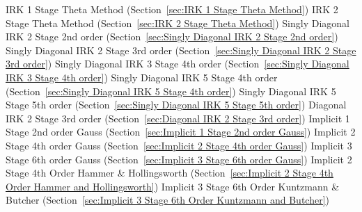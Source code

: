 \begin{list}{}
      \newline 
    IRK 1 Stage Theta Method (Section~\ref{sec:IRK 1 Stage Theta Method})
      \newline 
    IRK 2 Stage Theta Method (Section~\ref{sec:IRK 2 Stage Theta Method})
      \newline 
    Singly Diagonal IRK 2 Stage 2nd order (Section~\ref{sec:Singly Diagonal IRK 2 Stage 2nd order})
      \newline 
    Singly Diagonal IRK 2 Stage 3rd order (Section~\ref{sec:Singly Diagonal IRK 2 Stage 3rd order})
      \newline 
    Singly Diagonal IRK 3 Stage 4th order (Section~\ref{sec:Singly Diagonal IRK 3 Stage 4th order})
      \newline 
    Singly Diagonal IRK 5 Stage 4th order (Section~\ref{sec:Singly Diagonal IRK 5 Stage 4th order})
      \newline 
    Singly Diagonal IRK 5 Stage 5th order (Section~\ref{sec:Singly Diagonal IRK 5 Stage 5th order})
      \newline 
    Diagonal IRK 2 Stage 3rd order (Section~\ref{sec:Diagonal IRK 2 Stage 3rd order})
      \newline 
    Implicit 1 Stage 2nd order Gauss (Section~\ref{sec:Implicit 1 Stage 2nd order Gauss})
      \newline 
    Implicit 2 Stage 4th order Gauss (Section~\ref{sec:Implicit 2 Stage 4th order Gauss})
      \newline 
    Implicit 3 Stage 6th order Gauss (Section~\ref{sec:Implicit 3 Stage 6th order Gauss})
      \newline 
    Implicit 2 Stage 4th Order Hammer \& Hollingsworth (Section~\ref{sec:Implicit 2 Stage 4th Order Hammer and Hollingsworth})
      \newline 
    Implicit 3 Stage 6th Order Kuntzmann \& Butcher (Section~\ref{sec:Implicit 3 Stage 6th Order Kuntzmann and Butcher})

\end{list}
